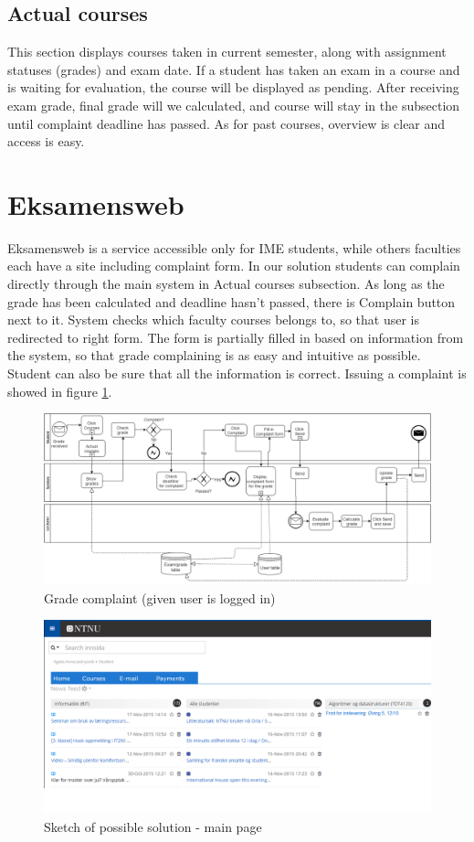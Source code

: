 \subsection{Actual courses}
This section displays courses taken in current semester, along with assignment statuses (grades) and exam date. If a student has taken an exam in a course and is waiting for evaluation, the course will be displayed as pending. After receiving exam grade, final grade will we calculated, and course will stay in the subsection until complaint deadline has passed. As for past courses, overview is clear and access is easy.  

\section{Eksamensweb}
Eksamensweb is a service accessible only for IME students, while others faculties each have a site including complaint form. In our solution students can complain directly through the main system in Actual courses subsection. As long as the grade has been calculated and deadline hasn't passed, there is Complain button next to it. System checks which faculty courses belongs to, so that user is redirected to right form. The form is partially filled in based on information from the system, so that grade complaining is as easy and intuitive as possible. Student can also be sure that all the information is correct. Issuing a complaint is showed in figure \ref{fig:complaint}.  


\begin{figure}[h]
\centering
\includegraphics[width=\linewidth]{grade_complaint.png}
\caption{Grade complaint (given user is logged in)}
\label{fig:complaint}
\end{figure}
\newpage

\begin{figure}[h]
\centering
\includegraphics[width=\linewidth]{home.png}
\caption{Sketch of possible solution - main page}
\label{fig:home}
\end{figure}
\newpage


